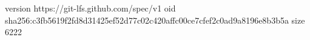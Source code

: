 version https://git-lfs.github.com/spec/v1
oid sha256:c3fb5619f2fd8d31425ef52d77c02c420affc00ce7cfef2c0ad9a8196e8b3b5a
size 6222

